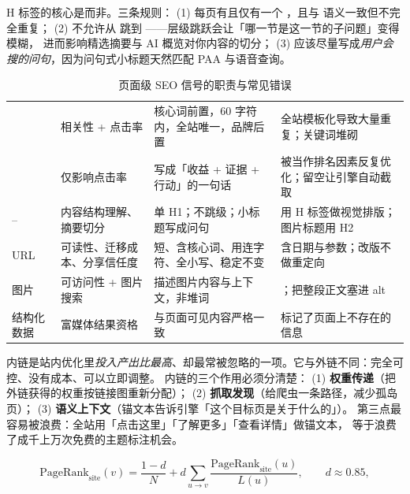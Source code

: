 H 标签的核心是而非。三条规则：
(1) 每页有且仅有一个 ，且与  语义一致但不完全重复；
(2) 不允许从  跳到 ——层级跳跃会让「哪一节是这一节的子问题」变得模糊，
进而影响精选摘要与 AI 概览对你内容的切分；
(3)  应该尽量写成\emph{用户会搜的问句}，因为问句式小标题天然匹配 PAA 与语音查询。

\begin{table}[htbp]
\centering
\caption{页面级 SEO 信号的职责与常见错误}
\label{tab:onpage}
\small
\begin{tabularx}{\textwidth}{L{2.2cm} L{3.4cm} L{3.2cm} Y}
\toprule
{} &  &  &  \\
\midrule
{} & 相关性 + 点击率 & 核心词前置，60 字符内，全站唯一，品牌后置 & 全站模板化导致大量重复；关键词堆砌 \\
 & 仅影响点击率 & 写成「收益 + 证据 + 行动」的一句话 & 被当作排名因素反复优化；留空让引擎自动截取 \\
-- & 内容结构理解、摘要切分 & 单 H1；不跳级；小标题写成问句 & 用 H 标签做视觉排版；图片标题用 H2 \\
URL & 可读性、迁移成本、分享信任度 & 短、含核心词、用连字符、全小写、稳定不变 & 含日期与参数；改版不做重定向 \\
图片  & 可访问性 + 图片搜索 & 描述图片内容与上下文，非堆词 & ；把整段正文塞进 alt \\
结构化数据 & 富媒体结果资格 & 与页面可见内容严格一致 & 标记了页面上不存在的信息 \\
\bottomrule
\end{tabularx}
\end{table}

内链是站内优化里\emph{投入产出比最高}、却最常被忽略的一项。它与外链不同：完全可控、没有成本、可以立即调整。
内链的三个作用必须分清楚：
(1) \textbf{权重传递}（把外链获得的权重按链接图重新分配）；
(2) \textbf{抓取发现}（给爬虫一条路径，减少孤岛页）；
(3) \textbf{语义上下文}（锚文本告诉引擎「这个目标页是关于什么的」）。
第三点最容易被浪费：全站用「点击这里」「了解更多」「查看详情」做锚文本，
等于浪费了成千上万次免费的主题标注机会。

\begin{equation}
\text{PageRank}_{\text{site}}(v) = \frac{1-d}{N} + d \sum_{u \to v} \frac{\text{PageRank}_{\text{site}}(u)}{L(u)} ,
\qquad d \approx 0.85 ,
\label{eq:internal-pr}
\end{equation}

